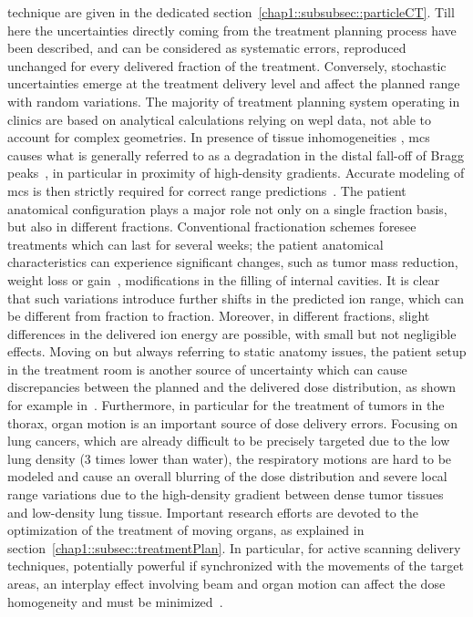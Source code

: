technique are given in the dedicated section~\ref{chap1::subsubsec::particleCT}.
Till here the uncertainties directly coming from the treatment planning process have been described, and can be considered as systematic errors, reproduced unchanged for every delivered fraction of the treatment. Conversely, stochastic uncertainties emerge at the treatment delivery level and affect the planned range with random variations. The majority of treatment planning system operating in clinics are based on analytical calculations relying on \gls{wepl} data, not able to account for complex geometries. In presence of tissue inhomogeneities , \gls{mcs} causes what is generally referred to as a degradation in the distal fall-off of Bragg peaks~\parencite{Urie1986}, in particular in proximity of high-density gradients.  Accurate modeling of \gls{mcs} is then strictly required for correct range predictions~\parencite{Schuemann2014}. The patient anatomical configuration plays a major role not only on a single fraction basis, but also in different fractions. Conventional fractionation schemes foresee treatments which can last for several weeks; the patient anatomical characteristics can experience significant changes, such as tumor mass reduction, weight loss or gain~\parencite{Albertini2008}, modifications in the filling of internal cavities. It is clear that such variations introduce further shifts in the predicted ion range, which can be different from fraction to fraction. Moreover, in different fractions, slight differences in the delivered ion energy are possible, with small but not negligible effects. 
Moving on but always referring to static anatomy issues, the patient setup in the treatment room is another source of uncertainty which can cause discrepancies between the planned and the delivered dose distribution, as shown for example in~\cite{Fattori2014}. 
Furthermore, in particular for the treatment of tumors in the thorax, organ motion  is an important source of dose delivery errors. Focusing on lung cancers, which are already difficult to be precisely targeted due to the low lung density (3 times lower than water), the respiratory motions are hard to be modeled and cause an overall blurring of the dose distribution and severe local range variations due to the high-density gradient between dense tumor tissues and low-density lung tissue. Important research efforts are devoted to the optimization of the treatment of moving organs, as explained in section~\ref{chap1::subsec::treatmentPlan}. In particular, for active scanning delivery techniques, potentially powerful if synchronized with the movements of the target areas, an interplay effect involving beam and organ motion can affect the dose homogeneity and must be minimized~\parencite{Dowdell2013, Grassberger2015}.
